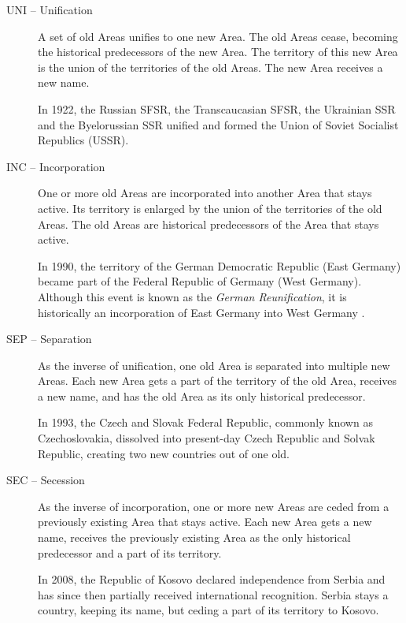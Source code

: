 \begin{description}

  \item[UNI -- Unification]
  A set of old Areas unifies to one new Area. The old Areas cease, becoming the historical predecessors of the new Area. The territory of this new Area is the union of the territories of the old Areas. The new Area receives a new name. \\[0.25em]
  \begin{footnotesize}
    In 1922, the Russian SFSR, the Transcaucasian SFSR, the Ukrainian SSR and the Byelorussian SSR unified and formed the Union of Soviet Socialist Republics (USSR).
  \end{footnotesize}

  \item[INC -- Incorporation]
  One or more old Areas are incorporated into another Area that stays active. Its territory is enlarged by the union of the territories of the old Areas. The old Areas are historical predecessors of the Area that stays active. \\[0.25em]
  \begin{footnotesize}
    In 1990, the territory of the German Democratic Republic (East Germany) became part of the Federal Republic of Germany (West Germany). Although this event is known as the \emph{German Reunification}, it is historically an incorporation of East Germany into West Germany \cite{incorporationEastWestGermany}.
  \end{footnotesize}

  \item[SEP -- Separation]
  As the inverse of unification, one old Area is separated into multiple new Areas. Each new Area gets a part of the territory of the old Area, receives a new name, and has the old Area as its only historical predecessor. \\[0.25em]
  \begin{footnotesize}
    In 1993, the Czech and Slovak Federal Republic, commonly known as Czechoslovakia, dissolved into present-day Czech Republic and Solvak Republic, creating two new countries out of one old.
  \end{footnotesize}

  \item[SEC -- Secession]
  As the inverse of incorporation, one or more new Areas are ceded from a previously existing Area that stays active. Each new Area gets a new name, receives the previously existing Area as the only historical predecessor and a part of its territory. \\[0.25em]
  \begin{footnotesize}
    In 2008, the Republic of Kosovo declared independence from Serbia and has since then partially received international recognition. Serbia stays a country, keeping its name, but ceding a part of its territory to Kosovo.
  \end{footnotesize}


\end{description}
